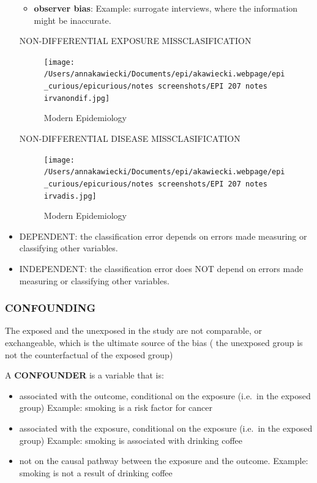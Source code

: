 \documentclass[
]{article}
\providecommand{\tightlist}{%
  \setlength{\itemsep}{0pt}\setlength{\parskip}{0pt}}
\begin{document}
\begin{itemize}
  \begin{itemize}
  \tightlist
  \item
    \textbf{observer bias}: Example: surrogate interviews, where the
    information might be inaccurate.
  \end{itemize}

  NON-DIFFERENTIAL EXPOSURE MISSCLASIFICATION

  \begin{figure}
  \centering
  \texttt{[image: /Users/annakawiecki/Documents/epi/akawiecki.webpage/epi\_curious/epicurious/notes screenshots/EPI 207 notes irvanondif.jpg]}
  \caption{Modern Epidemiology}
  \end{figure}

  NON-DIFFERENTIAL DISEASE MISSCLASIFICATION

  \begin{figure}
  \centering
  \texttt{[image: /Users/annakawiecki/Documents/epi/akawiecki.webpage/epi\_curious/epicurious/notes screenshots/EPI 207 notes irvadis.jpg]}
  \caption{Modern Epidemiology}
  \end{figure}
\item
  DEPENDENT: the classification error depends on errors made measuring
  or classifying other variables.
\item
  INDEPENDENT: the classification error does NOT depend on errors made
  measuring or classifying other variables.
\end{itemize}

\hypertarget{confounding}{%
\subsubsection{CONFOUNDING}\label{confounding}}

The exposed and the unexposed in the study are not comparable, or
exchangeable, which is the ultimate source of the bias ( the unexposed
group is not the counterfactual of the exposed group)

A \textbf{CONFOUNDER} is a variable that is:

\begin{itemize}
\item
  associated with the outcome, conditional on the exposure (i.e.~in the
  exposed group) Example: smoking is a risk factor for cancer
\item
  associated with the exposure, conditional on the exposure (i.e.~in the
  exposed group) Example: smoking is associated with drinking coffee
\item
  not on the causal pathway between the exposure and the outcome.
  Example: smoking is not a result of drinking coffee
\end{itemize}
\end{document}

